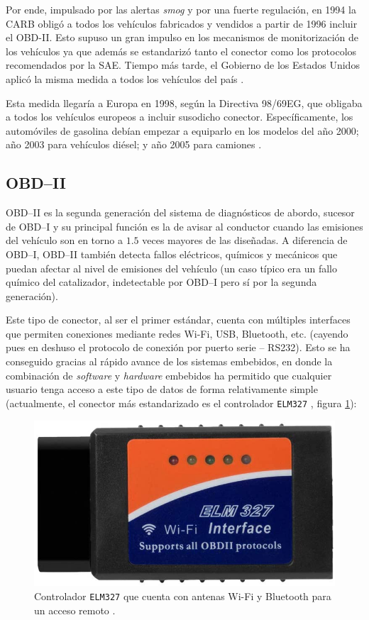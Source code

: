 Por ende, impulsado por las alertas \textit{smog} y por una fuerte regulación, en 1994
la \ac{CARB} obligó a todos los vehículos fabricados y vendidos a partir de 1996 incluir
el \ac{OBD}-II. Esto supuso un gran impulso en los mecanismos de monitorización de los
vehículos ya que además se estandarizó tanto el conector como los protocolos recomendados
por la \ac{SAE}. Tiempo más tarde, el Gobierno de los Estados Unidos aplicó la misma
medida a todos los vehículos del país \cite{SistemaOBD2Historia}.

Esta medida llegaría a Europa en 1998, según la Directiva 98/69EG, que obligaba a
todos los vehículos europeos a incluir susodicho conector. Específicamente, los
automóviles de gasolina debían empezar a equiparlo en los modelos del año 2000; año 2003
para vehículos diésel; y año 2005 para camiones \cite{SistemaOBD2Historia}.

\subsection*{OBD--II}
\ac{OBD}--II es la segunda generación del sistema de diagnósticos de abordo, sucesor
de \ac{OBD}--I y su principal función es la de avisar al conductor cuando las
emisiones del vehículo son en torno a $1.5$ veces mayores de las diseñadas. A
diferencia de \ac{OBD}--I, \ac{OBD}--II también detecta fallos eléctricos, químicos
y mecánicos que puedan afectar al nivel de emisiones del vehículo (un caso típico
era un fallo químico del catalizador, indetectable por \ac{OBD}--I pero sí por la
segunda generación).

Este tipo de conector, al ser el primer estándar, cuenta con
múltiples interfaces que permiten conexiones mediante redes Wi-Fi, USB, Bluetooth,
etc. (cayendo pues en deshuso el protocolo de conexión por puerto serie -- RS232).
Esto se ha conseguido gracias al rápido avance de los sistemas embebidos, en donde
la combinación de \textit{software} y \textit{hardware} embebidos ha permitido que
cualquier usuario tenga acceso a este tipo de datos de forma relativamente simple
(actualmente, el conector más estandarizado es el controlador \texttt{ELM327} \cite{SistemaOBD2Historia},
figura \ref{fig:elm327}):

\begin{figure}[H]
  \centering
  \includegraphics[width=.7\linewidth]{images/obd-ii-elm327.jpg}
  \caption{Controlador \texttt{ELM327} que cuenta con antenas Wi-Fi y Bluetooth para un acceso remoto \cite{AmazonComElm327}.}
  \label{fig:elm327}
\end{figure}

